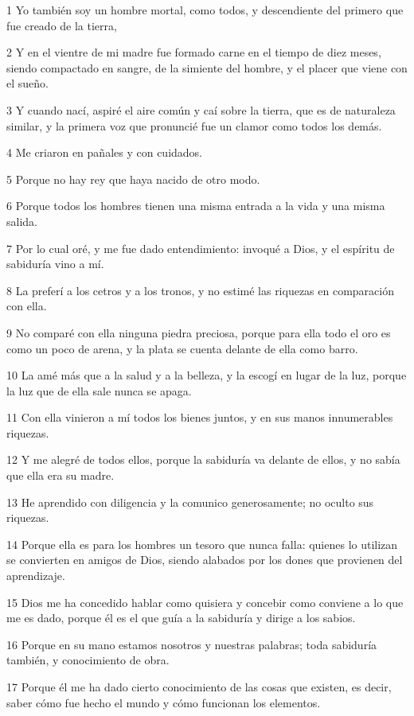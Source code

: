 \par 1 Yo también soy un hombre mortal, como todos, y descendiente del primero que fue creado de la tierra,
\par 2 Y en el vientre de mi madre fue formado carne en el tiempo de diez meses, siendo compactado en sangre, de la simiente del hombre, y el placer que viene con el sueño.
\par 3 Y cuando nací, aspiré el aire común y caí sobre la tierra, que es de naturaleza similar, y la primera voz que pronuncié fue un clamor como todos los demás.
\par 4 Me criaron en pañales y con cuidados.
\par 5 Porque no hay rey ​​que haya nacido de otro modo.
\par 6 Porque todos los hombres tienen una misma entrada a la vida y una misma salida.
\par 7 Por lo cual oré, y me fue dado entendimiento: invoqué a Dios, y el espíritu de sabiduría vino a mí.
\par 8 La preferí a los cetros y a los tronos, y no estimé las riquezas en comparación con ella.
\par 9 No comparé con ella ninguna piedra preciosa, porque para ella todo el oro es como un poco de arena, y la plata se cuenta delante de ella como barro.
\par 10 La amé más que a la salud y a la belleza, y la escogí en lugar de la luz, porque la luz que de ella sale nunca se apaga.
\par 11 Con ella vinieron a mí todos los bienes juntos, y en sus manos innumerables riquezas.
\par 12 Y me alegré de todos ellos, porque la sabiduría va delante de ellos, y no sabía que ella era su madre.
\par 13 He aprendido con diligencia y la comunico generosamente; no oculto sus riquezas.
\par 14 Porque ella es para los hombres un tesoro que nunca falla: quienes lo utilizan se convierten en amigos de Dios, siendo alabados por los dones que provienen del aprendizaje.
\par 15 Dios me ha concedido hablar como quisiera y concebir como conviene a lo que me es dado, porque él es el que guía a la sabiduría y dirige a los sabios.
\par 16 Porque en su mano estamos nosotros y nuestras palabras; toda sabiduría también, y conocimiento de obra.
\par 17 Porque él me ha dado cierto conocimiento de las cosas que existen, es decir, saber cómo fue hecho el mundo y cómo funcionan los elementos.
